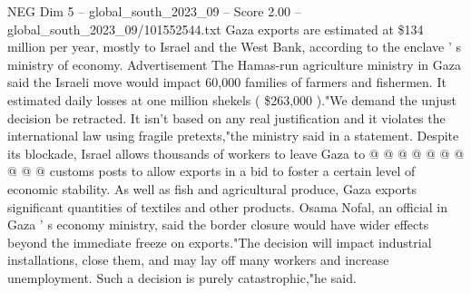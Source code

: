 \begin{textsample}{NEG Dim 5 – global\_south\_2023\_09 – Score 2.00 – global\_south\_2023\_09/101552544.txt}
Gaza exports are estimated at \$134 million per year, mostly to Israel and the West Bank, according to the enclave ' s ministry of economy.
Advertisement The Hamas-run agriculture ministry in Gaza said the Israeli move would impact 60,000 families of farmers and fishermen.
It estimated daily losses at one million shekels ( \$263,000 )."We demand the unjust decision be retracted.
It isn't based on any real justification and it violates the international law using fragile pretexts,"the ministry said in a statement.
Despite its blockade, Israel allows thousands of workers to leave Gaza to @ @ @ @ @ @ @ @ @ @ customs posts to allow exports in a bid to foster a certain level of economic stability.
As well as fish and agricultural produce, Gaza exports significant quantities of textiles and other products.
Osama Nofal, an official in Gaza ' s economy ministry, said the border closure would have wider effects beyond the immediate freeze on exports."The decision will impact industrial installations, close them, and may lay off many workers and increase unemployment.
Such a decision is purely catastrophic,"he said.

\end{textsample}
